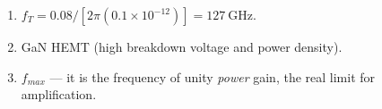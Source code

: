 \begin{enumerate}[leftmargin=1.6em,itemsep=2pt]
\item $f_T = 0.08/[2\pi(0.1\times10^{-12})] = 127\ \text{GHz}$.
\item GaN HEMT (high breakdown voltage and power density).
\item $f_{max}$ --- it is the frequency of unity \emph{power} gain, the real limit for amplification.
\end{enumerate}
